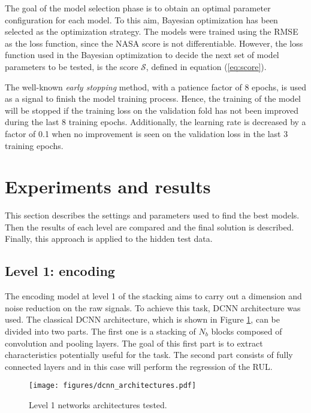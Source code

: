 \documentclass[PHM, 2021]{PHMSociety}
\begin{document}
The goal of the model selection phase is to obtain an optimal parameter configuration for each model. To this aim, Bayesian optimization has been selected as the optimization strategy. The models were trained using the RMSE as the loss function, since the NASA score is not differentiable. However, the loss function used in the Bayesian optimization to decide the next set of model parameters to be tested, is the score $\mathcal{S}$, defined in equation (\ref{eq:score}). 



The well-known \emph{early stopping} method, with a patience factor of 8 epochs, is used as a signal to finish the model training process. Hence, the training of the model will be stopped if the training loss on the validation fold has not been improved during the last 8 training epochs. Additionally, the learning rate is decreased by a factor of 0.1 when no improvement is seen on the validation loss in the last 3 training epochs.

\section{Experiments and results}

This section describes the settings and parameters used to find the best models. Then the results of each level are compared and the final solution is described. Finally, this approach is applied to the hidden test data.

\subsection{Level 1: encoding}

The encoding model at level 1 of the stacking aims to carry out a dimension and noise reduction on the raw signals. To achieve this task, DCNN architecture was used. The classical DCNN architecture, which is shown in Figure \ref{fig:architectures}, can be divided into two parts. The first one is a stacking of $N_b$ blocks composed of convolution and pooling layers. The goal of this first part is to extract characteristics potentially useful for the task. The second part consists of fully connected layers and in this case will perform the regression of the RUL.

\begin{figure}[t]
\centering
\texttt{[image: figures/dcnn\_architectures.pdf]}
\caption{Level 1 networks architectures tested.}
\label{fig:architectures}
\end{figure}
\end{document}
